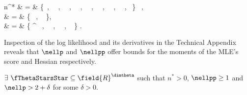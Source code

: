 \bqn
n^{*} & = & 	\min\big\{\nn \ , \ \mnf \ , \ \mnff \ , \ \mnfff \ , \ \nnl \ , \ \mnl \ , \ \mnlf \ , \ \mptildelff \ , \ \mptildellf \big\} \ ,
\label{eq_nstar}
\\
     \nellp & = & \min \Bigg\{ \nptildel \ , \ \frac{\nn   \ndFd}{\nn +\ndFd}  \Bigg \},
    \label{eq_nellp}
    \\
         \nellpp & = & \min \Bigg\{ 
    \nptilde^{\dlambda \dlambda} \ ,\ 
    \frac{\nptilde^{\dF\dlambda}\ndFd}{\nptilde^{\dF\dlambda} + \ndFd} \ ,\ \frac{ \nn^{\dF} \ndFdd}{ \nn^{\dF} + \ndFdd} \ , \  
    \frac{ \nn^{\dF \dF} \ndFd}{ 2\nn^{\dF \dF} + \ndFd}
    \Bigg \} .\\
    \label{eq_nellpp}
    \nonumber
\eqn

Inspection of the log likelihood and its derivatives in the Technical Appendix reveals that $\nellp$ and $\nellpp$ offer bounds for the moments of the MLE's score and Hessian respectively. 


\begin{ass}
\label{ass7}
$\exists\ \fThetaStarsStar \subseteq \field{R}^{\dimtheta}$ such that 
$n^{*}>0$, $\nellpp\geq 1$ and $\nellp > 2+\delta$ for some $\delta>0$.


\end{ass}


